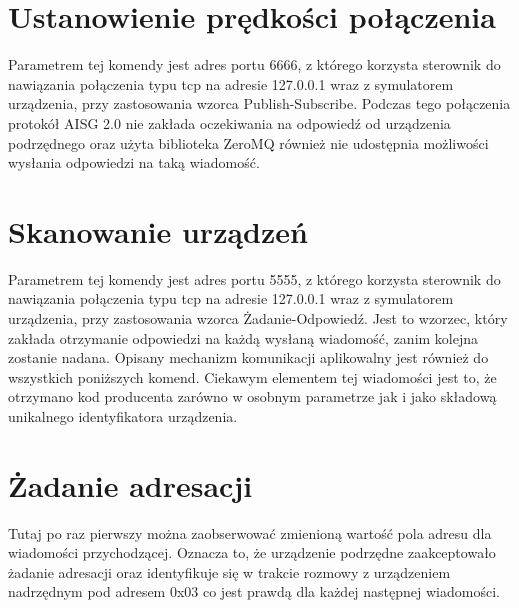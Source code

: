     \section{Ustanowienie prędkości połączenia}
    Parametrem tej komendy jest adres portu 6666, z którego korzysta sterownik
    do nawiązania połączenia typu tcp na adresie 127.0.0.1 wraz z symulatorem urządzenia,
    przy zastosowania wzorca Publish-Subscribe. Podczas tego połączenia protokół AISG 2.0 
    nie zakłada oczekiwania na odpowiedź od urządzenia podrzędnego oraz użyta biblioteka
    ZeroMQ również nie udostępnia możliwości wysłania odpowiedzi na taką wiadomość.

    \section{Skanowanie urządzeń}
    Parametrem tej komendy jest adres portu 5555, z którego korzysta sterownik
    do nawiązania połączenia typu tcp na adresie 127.0.0.1 wraz z symulatorem urządzenia,
    przy zastosowania wzorca Żadanie-Odpowiedź. Jest to wzorzec, który zakłada otrzymanie 
    odpowiedzi na każdą wysłaną wiadomość, zanim kolejna zostanie nadana. Opisany mechanizm komunikacji
    aplikowalny jest również do wszystkich poniższych komend.
    Ciekawym elementem tej wiadomości jest to, że otrzymano kod producenta zarówno
    w osobnym parametrze jak i jako składową unikalnego identyfikatora urządzenia.

    \section{Żadanie adresacji}
    Tutaj po raz pierwszy można zaobserwować zmienioną wartość pola adresu dla wiadomości
    przychodzącej. Oznacza to, że urządzenie podrzędne zaakceptowało żadanie adresacji 
    oraz identyfikuje się w trakcie rozmowy z urządzeniem nadrzędnym pod adresem 0x03 co
    jest prawdą dla każdej następnej wiadomości.
 
